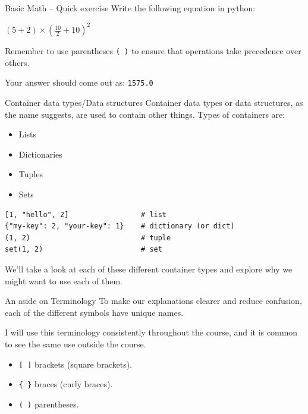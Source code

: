 \documentclass[10pt]{beamer}
\begin{document}
\begin{frame}[label={sec:org386713a},fragile]{Basic Math -- Quick exercise}
 Write the following equation in python:

\((5 + 2) \times (\frac{10}{2} + 10)^2\)

\alert{Remember} to use parentheses \texttt{( )} to ensure that operations take precedence over
others.

Your answer should come out as: \texttt{1575.0}
\end{frame}

\begin{frame}[label={sec:orga46e6ac},fragile]{Container data types/Data structures}
 Container data types or data structures, as the name suggests, are used to contain
other things. Types of containers are:

\begin{itemize}
\item Lists
\item Dictionaries
\item Tuples
\item Sets
\end{itemize}

\begin{verbatim}
[1, "hello", 2]                 # list
{"my-key": 2, "your-key": 1}    # dictionary (or dict)
(1, 2)                          # tuple
set(1, 2)                       # set
\end{verbatim}

We'll take a look at each of these different container types and explore why we
might want to use each of them.
\end{frame}

\begin{frame}[label={sec:org4001457},fragile]{An aside on Terminology}
 To make our explanations clearer and reduce confusion, each of the different symbols
have unique names.

I will use this terminology consistently throughout the course, and it is common to
see the same use outside the course.

\begin{itemize}
\item \texttt{[ ]} brackets (square brackets).
\item \texttt{\{ \}} braces (curly braces).
\item \texttt{( )} parentheses.
\end{itemize}
\end{frame}
\end{document}
